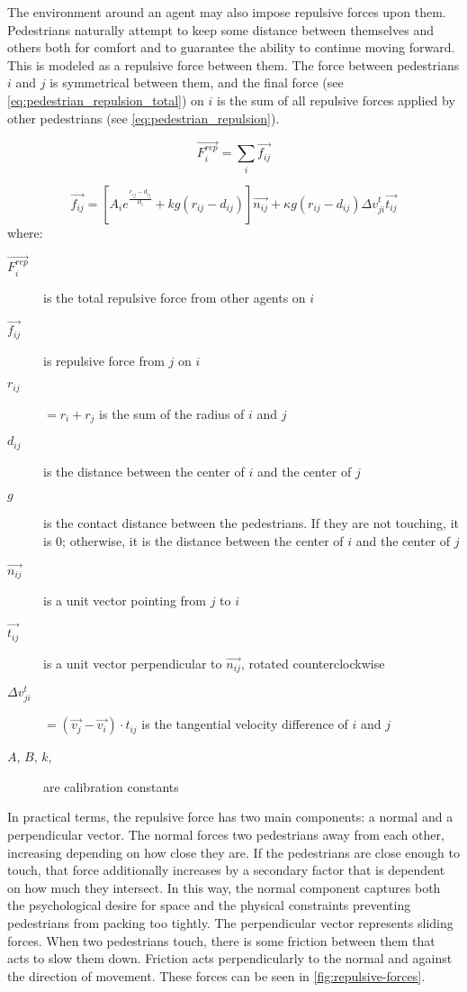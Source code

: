 \documentclass[twoside, 11pt]{article}
\begin{document}
The environment around an agent may also impose repulsive forces upon them. Pedestrians naturally attempt to keep some distance between themselves and others both for comfort and to guarantee the ability to continue moving forward. This is modeled as a repulsive force between them. The force between pedestrians $i$ and $j$ is symmetrical between them, and the final force (see \autoref{eq:pedestrian_repulsion_total}) on $i$ is the sum of all repulsive forces applied by other pedestrians (see \autoref{eq:pedestrian_repulsion}).

\begin{equation}
  \vec{F_i^{rep}} = \sum_i\vec{f_{ij}}
  \label{eq:pedestrian_repulsion_total}
\end{equation}

\begin{equation}
  \vec{f_{ij}} = [A_ie^{\frac{r_{ij} - d_{ij}}{B_i}} + kg(r_{ij}-d_{ij})]\vec{n_{ij}} + \kappa g (r_{ij} - d_{ij})\Delta v_{ji}^t \vec{t_{ij}}
  \label{eq:pedestrian_repulsion}
\end{equation}
where:
\begin{description}
  \item[$\vec{F_i^{rep}}$] is the total repulsive force from other agents on $i$
  \item[$\vec{f_{ij}}$] is repulsive force from $j$ on $i$
  
  \item[$r_{ij}$] $= r_i + r_j$ is the sum of the radius of $i$ and $j$
  \item[$d_{ij}$] is the distance between the center of $i$ and the center of $j$
  \item[$g$] is the contact distance between the pedestrians. If they are not touching, it is $0$; otherwise, it is the distance between the center of $i$ and the center of $j$
  \item[$\vec{n_{ij}}$] is a unit vector pointing from $j$ to $i$
  \item[$\vec{t_{ij}}$] is a unit vector perpendicular to $\vec{n_{ij}}$, rotated counterclockwise
  \item[$\Delta v_{ji}^t$] $= (\vec{v_j} - \vec{v_i}) \cdot t_{ij}$ is the tangential velocity difference of $i$ and $j$
  \item[$A$, $B$, $k$, \kappa] are calibration constants
\end{description}

In practical terms, the repulsive force has two main components: a normal and a perpendicular vector. The normal forces two pedestrians away from each other, increasing depending on how close they are. If the pedestrians are close enough to touch, that force additionally increases by a secondary factor that is dependent on how much they intersect. In this way, the normal component captures both the psychological desire for space and the physical constraints preventing pedestrians from packing too tightly. The perpendicular vector represents sliding forces. When two pedestrians touch, there is some friction between them that acts to slow them down. Friction acts perpendicularly to the normal and against the direction of movement. These forces can be seen in \autoref{fig:repulsive-forces}.
\end{document}
